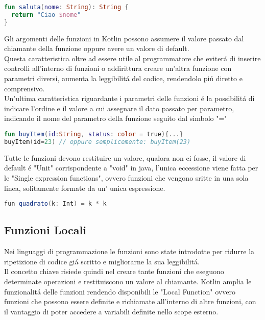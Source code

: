 \begin{lstlisting}[language=Kotlin,caption={Esempio Funzione Kotlin}]
fun saluta(nome: String): String {
  return "Ciao $nome"
}
\end{lstlisting}

Gli argomenti delle funzioni in Kotlin possono assumere il valore passato dal chiamante della funzione oppure avere un valore di default.\\ Questa caratteristica oltre ad essere utile al programmatore che eviter\'a di inserire controlli all'interno di funzioni o addirittura creare un'altra funzione con parametri diversi, aumenta la leggibilit\'a del codice, rendendolo pi\'u diretto e comprensivo.\\
Un'ultima caratteristica riguardante i parametri delle funzioni \'e la possibilit\'a di indicare l'ordine e il valore a cui assegnare il dato passato per parametro, indicando il nome del parametro della funzione seguito dal simbolo "="

\begin{lstlisting}[language=kotlin,caption={Esempio Kotlin Parametri}]
fun buyItem(id:String, status: color = true){...}
buyItem(id=23) // oppure semplicemente: buyItem(23)
\end{lstlisting}

Tutte le funzioni devono restituire un valore, qualora non ci fosse, il valore di default \'e "Unit" corrispondente a "void" in java, l'unica eccessione viene fatta per le "Single expression functions", ovvero funzioni che vengono sritte in una sola linea, solitamente formate da un' unica espressione.
\begin{lstlisting}[language=java,caption={Esempio Single Exp. Function}]
fun quadrato(k: Int) = k * k
\end{lstlisting}

\subsection{Funzioni Locali}
Nei linguaggi di programmazione le funzioni sono state introdotte per ridurre la ripetizione di codice gi\'a scritto e migliorarne la sua leggibilit\'a.\\
Il concetto chiave risiede quindi nel creare tante funzioni che eseguono determinate operazioni e restituiscono un valore al chiamante.
Kotlin amplia le funzionalit\'a delle funzioni rendendo disponibili le "Local Function" ovvero funzioni che possono essere definite e richiamate all'interno di altre funzioni, con il vantaggio di poter accedere a variabili definite nello scope esterno.


